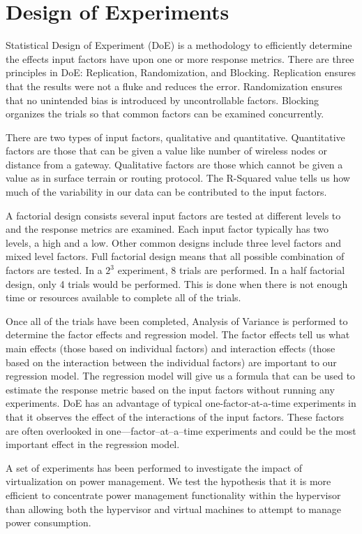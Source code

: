 \documentclass[preprint]{sigplanconf}
\begin{document}
\section{Design of Experiments}
\label{sec:DoE}
Statistical Design of Experiment (DoE) \cite{Montgomery2005} is a methodology
to efficiently determine the effects input factors have upon one or more
response metrics.  There are three principles in DoE: Replication,
Randomization, and Blocking.  Replication ensures that the results were not a
fluke and reduces the error.  Randomization ensures that no unintended bias is
introduced by uncontrollable factors.  Blocking organizes the trials so that
common factors can be examined concurrently.

There are two types of input factors, qualitative and quantitative.
Quantitative factors are those that can be given a value like number of
wireless nodes or distance from a gateway.  Qualitative factors are those
which cannot be given a value as in surface terrain or routing protocol.  The
R-Squared value tells us how much of the variability in our data can be
contributed to the input factors.

A factorial design consists several input factors are tested at different
levels to and the response metrics are examined.  Each input factor typically
has two levels, a high and a low.  Other common designs include three level
factors and mixed level factors.  Full factorial design means that all
possible combination of factors are tested.  In a $2^{3}$ experiment, 8 trials
are performed.  In a half factorial design, only 4 trials would be performed.
This is done when there is not enough time or resources available to complete
all of the trials.

Once all of the trials have been completed, Analysis of Variance is performed
to determine the factor effects and regression model.  The factor effects tell
us what main effects (those based on individual factors) and interaction
effects (those based on the interaction between the individual factors) are
important to our regression model.  The regression model will give us a
formula that can be used to estimate the response metric based on the input
factors without running any experiments.  DoE has an advantage of typical
one-factor-at-a-time experiments in that it observes the effect of the
interactions of the input factors.  These factors are often overlooked in
one---factor--at--a--time experiments and could be the most important effect
in the regression model.

A set of experiments has been performed to investigate the impact of
virtualization on power management.  We test the hypothesis that it is
more efficient to concentrate power management functionality within the
hypervisor than allowing both the hypervisor and virtual machines to attempt
to manage power consumption. 
\end{document}
